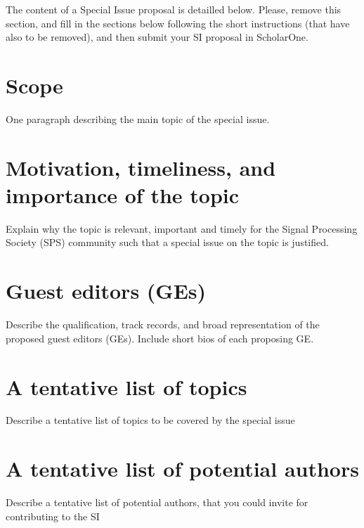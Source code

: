 \documentclass[journal,onecolumn]{IEEEtran}
\begin{document}
{\color{blue} The content of a Special Issue proposal is detailled below. Please, remove this section, and fill in the sections below following the short instructions (that have also to be removed), and then submit your SI proposal in ScholarOne.}


\section{Scope}
\par One paragraph describing the main topic of the special issue. 

\section{Motivation, timeliness, and importance of the topic }
\label{secrel}
\par Explain why the topic is relevant, important and timely for the Signal Processing Society (SPS) community such that a special issue on the topic is justified.
\section{Guest editors (GEs)}
\label{secge}
\par Describe the qualification, track records, and broad representation of the proposed guest editors (GEs). Include short bios of each proposing GE.
\section{A tentative list of topics}
\label{secge}
\par Describe a tentative list of topics to be covered by the special issue
\section{A tentative list of potential authors}
\label{secge}
\par Describe a tentative list of potential authors, that you could invite for contributing to the SI
\end{document}
